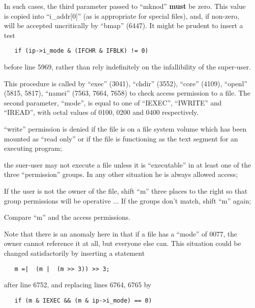 In  such  cases,  the  third  parameter
passed  to  ``mknod'' {\bf must} be zero.  This
value is copied into ``i\_addr[0]'' (as is
appropriate for special files), and, if
non-zero, will be accepted uncritically
by  ``bmap''  (6447). It might be prudent
to insert a test

\begin{verbatim}
   if (ip->i_mode & (IFCHR & IFBLK) != 0)
\end{verbatim}

\noindent before  line  5969,  rather  than  rely
indefinitely  on  the  infallibility of
the super-user.



This  procedure  is  called  by  ``exec''
(3041),  ``chdir'' (3552), ``core'' (4109),
``openl'' (5815,  5817),  ``namei''  (7563,
7664,  7658) to check access permission
to  a  file.  The   second   parameter,
``mode'',  is  equal  to  one of ``IEXEC'',
``IWRITE'' and ``IREAD'', with octal values
of 0100, 0200 and 0400 respectively.

\bd
\item[6753:] ``write'' permission is  denied  if
      the  file  is  on  a  file system
      volume which has been mounted  as
      ``read  only''  or  if  the file is
      functioning as the  text  segment
      for an executing program;

\item[6763:] the suer-user may not execute  a
file unless it is ``executable'' in
at least one of the  three  ``permission''  groups.  In  any  other
situation he  is  always  allowed
access;

\item[6769:] If the user is not the  owner  of
      the  file, shift ``m'' three places
      to the right so that  group  permissions will be operative ... If
      the groups don't match, shift ``m''
      again;

\item[6774:] Compare ``m'' and the  access  permissions.
\ed


Note that there is an anomaly  here  in
that  if  a  file has a ``mode'' of 0077,
the owner cannot reference it  at  all,
but  everyone  else can. This situation
could  be  changed  satisfactorily   by
inserting a statement

\begin{verbatim}
   m =|  (m |  (m >> 3)) >> 3;
\end{verbatim}

\noindent after line 6752,  and  replacing  lines
6764, 6765 by

\begin{verbatim}
   if (m & IEXEC && (m & ip->i_mode) == 0)
\end{verbatim}
